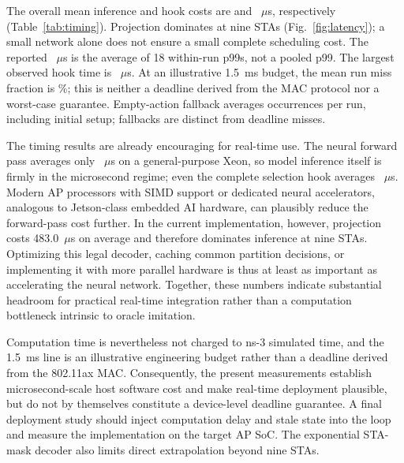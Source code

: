 \documentclass[lettersize,journal]{IEEEtran}
\begin{document}
The overall mean inference and hook costs are \InferenceMean{} and
\DecisionMean{}~$\mu$s, respectively (Table~\ref{tab:timing}). Projection
dominates at nine STAs (Fig.~\ref{fig:latency}); a small network alone
does not ensure a small complete scheduling cost. The reported
\DecisionPninetyNine{}~$\mu$s is the average of 18 within-run p99s,
not a pooled p99. The largest observed hook time is
\DecisionMaximum{}~$\mu$s. At an illustrative 1.5~ms budget, the mean
run miss fraction is \MissPercent\%; this is neither a deadline derived
from the MAC protocol nor a worst-case guarantee. Empty-action fallback
averages \FallbackMean{} occurrences per run, including initial setup;
fallbacks are distinct from deadline misses.

The timing results are already encouraging for real-time use. The neural
forward pass averages only \InferenceMean{}~$\mu$s on a general-purpose Xeon,
so model inference itself is firmly in the microsecond regime; even the complete
selection hook averages \DecisionMean{}~$\mu$s. Modern AP processors with SIMD
support or dedicated neural accelerators, analogous to Jetson-class embedded
AI hardware, can plausibly reduce the forward-pass cost further. In the current
implementation, however, projection costs 483.0~$\mu$s on average and therefore
dominates inference at nine STAs. Optimizing this legal decoder, caching common
partition decisions, or implementing it with more parallel hardware is thus at
least as important as accelerating the neural network. Together, these numbers
indicate substantial headroom for practical real-time integration rather than
a computation bottleneck intrinsic to oracle imitation.

Computation time is nevertheless not charged to ns-3 simulated time, and the
1.5~ms line is an illustrative engineering budget rather than a deadline derived
from the 802.11ax MAC. Consequently, the present measurements establish
microsecond-scale host software cost and make real-time deployment plausible,
but do not by themselves constitute a device-level deadline guarantee. A final
deployment study should inject computation delay and stale state into the loop
and measure the implementation on the target AP SoC. The exponential STA-mask
decoder also limits direct extrapolation beyond nine STAs.
\end{document}
